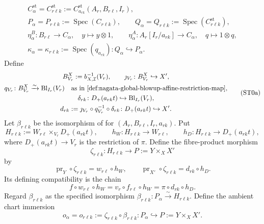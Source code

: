 \begin{definition}
\[\begin{gathered}
    C^{\mathrm{st}}_\alpha=C^{\mathrm{st}}_{r\ell k}:=
      C_{a_{rk}}^{\mathrm{st}}(A_r,B_{r\ell},I_r),\\
    P_\alpha=P_{r\ell k}:=\operatorname{Spec}(C_{r\ell k}),\qquad
    Q_\alpha=Q_{r\ell k}:=\operatorname{Spec}(C^{\mathrm{st}}_{r\ell k}),\\
    \eta^B_\alpha\colon B_{r\ell}\to C_\alpha,\quad
      y\mapsto y\otimes1,\qquad
    \eta^A_\alpha\colon A_r[I_r/a_{rk}]\to C_\alpha,\quad
      q\mapsto1\otimes q,\\
    \kappa_\alpha=\kappa_{r\ell k}:=\operatorname{Spec}(q_{a_{rk}})
      \colon Q_\alpha\hookrightarrow P_\alpha.
  \end{gathered}
  \]
  Define
  \[
  \begin{gathered}
    B_{V_r}^X:=b_{X,\mathcal I}^{-1}(V_r),\qquad
    \jmath_{V_r}\colon B_{V_r}^X\hookrightarrow X',\\
    q_{V_r}\colon B_{V_r}^X\xrightarrow{\sim}
      \operatorname{Bl}_{I_r}(V_r)
      \quad\text{as in
        \Cref{def:nagata-global-blowup-affine-restriction-map}},\\
    \delta_{rk}\colon D_+(a_{rk}t)
      \hookrightarrow\operatorname{Bl}_{I_r}(V_r),\\
    d_{rk}:=\jmath_{V_r}\circ q_{V_r}^{-1}\circ\delta_{rk}
      \colon D_+(a_{rk}t)\hookrightarrow X'.
  \end{gathered}                                                   \tag{ST0a}
  \]
  Let
  $\beta_{r\ell k}$ be the isomorphism of
   for
  $(A_r,B_{r\ell},I_r,a_{rk})$.  Put
  \[
    H_{r\ell k}:=
      W_{r\ell}\times_{V_r}D_+(a_{rk}t),
    \qquad
    h_W\colon H_{r\ell k}\to W_{r\ell},
    \qquad
    h_D\colon H_{r\ell k}\to D_+(a_{rk}t),
  \]
  where $D_+(a_{rk}t)\to V_r$ is the restriction of $\pi$.  Define the
  fibre-product morphism
  \[
    \zeta_{r\ell k}\colon H_{r\ell k}\longrightarrow
      P:=Y\times_XX'
  \]
  by
  \[
    \operatorname{pr}_Y\circ\zeta_{r\ell k}
      =w_{r\ell}\circ h_W,
    \qquad
    \operatorname{pr}_{X'}\circ\zeta_{r\ell k}
      =d_{rk}\circ h_D.
  \]
  Its defining compatibility is the chain
  \[
    f\circ w_{r\ell}\circ h_W
      =v_r\circ f_{r\ell}\circ h_W
      =\pi\circ d_{rk}\circ h_D.
  \]
  Regard $\beta_{r\ell k}$ as the specified isomorphism
  $\beta_{r\ell k}\colon P_\alpha\xrightarrow{\sim}H_{r\ell k}$.  Define
  the ambient chart immersion
  \[
    o_\alpha=o_{r\ell k}:=
      \zeta_{r\ell k}\circ\beta_{r\ell k}
      \colon P_\alpha\hookrightarrow P:=Y\times_XX'.
\]
\end{definition}
